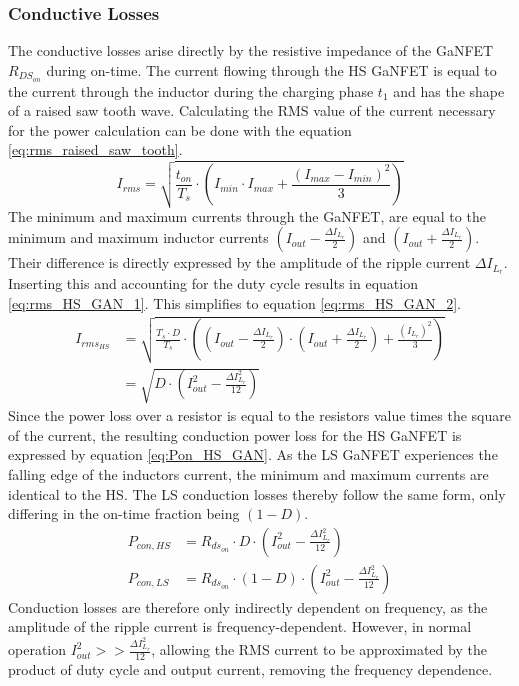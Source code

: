 \subsubsection{Conductive Losses}
The conductive losses arise directly by the resistive impedance of the \ac{GaNFET} $R_{DS_{on}}$ during on-time. The current flowing through the \ac{HS} \ac{GaNFET} is equal to the current through the inductor during the charging phase $t_1$ and has the shape of a raised saw tooth wave. Calculating the \ac{RMS} value of the current necessary for the power calculation can be done with the equation \ref{eq:rms_raised_saw_tooth}. 
\begin{equation}
    I_{rms} = \sqrt{\frac{t_{on}}{T_s} \cdot \left( I_{min}\cdot I_{max}+\frac{\left(I_{max}-I_{min}\right)^2}{3}\right)} \label{eq:rms_raised_saw_tooth}
\end{equation}
The minimum and maximum currents through the \ac{GaNFET}, are equal to the minimum and maximum inductor currents $(I_{out}-\frac{\Delta I_{L_r}}{2})$ and $(I_{out}+\frac{\Delta I_{L_r}}{2})$. Their difference is directly expressed by the amplitude of the ripple current $\Delta I_{L_r}$. Inserting this and accounting for the duty cycle results in equation \ref{eq:rms_HS_GAN_1}. This simplifies to equation \ref{eq:rms_HS_GAN_2}. 
\begin{align}
    I_{rms_{HS}} &= \sqrt{\frac{T_s\cdot D}{T_s} \cdot \left(\left(I_{out}-\frac{\Delta I_{L_r}}{2}\right)\cdot \left(I_{out}+\frac{\Delta I_{L_r}}{2}\right)+\frac{\left(I_{L_r}\right)^2}{3}\right)}\label{eq:rms_HS_GAN_1}\\
    &=\sqrt{D \cdot \left(I_{out}^2 - \frac{\Delta I_{L_r}^2}{12}\right)}\label{eq:rms_HS_GAN_2}
\end{align}
Since the power loss over a resistor is equal to the resistors value times the square of the current, the resulting conduction power loss for the \ac{HS} \ac{GaNFET} is expressed by equation \ref{eq:Pon_HS_GAN}. As the \ac{LS} \ac{GaNFET} experiences the falling edge of the inductors current, the minimum and maximum currents are identical to the \ac{HS}. The \ac{LS} conduction losses thereby follow the same form, only differing in the on-time fraction being $\left(1-D\right)$.
\begin{align}
    P_{con,HS} &= R_{ds_{on}} \cdot D \cdot \left(I_{out}^2 - \frac{\Delta I_{L_r}^2}{12}\right)\label{eq:Pon_HS_GAN}\\
    P_{con,LS} &= R_{ds_{on}} \cdot \left(1-D\right) \cdot \left(I_{out}^2 - \frac{\Delta I_{L_r}^2}{12}\right)\label{eq:Pon_LS_GAN}
\end{align}
Conduction losses are therefore only indirectly dependent on frequency, as the amplitude of the ripple current is frequency-dependent. However, in normal operation $I_{out}^2 >> \frac{\Delta I_{L_r}^2}{12}$, allowing the \ac{RMS} current to be approximated by the product of duty cycle and output current, removing the frequency dependence. 
